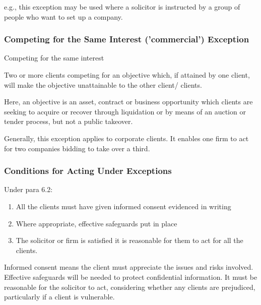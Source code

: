 \documentclass[
]{article}
\providecommand{\tightlist}{%
  \setlength{\itemsep}{0pt}\setlength{\parskip}{0pt}}
\newenvironment{env-86a00e9b-0e00-4fe8-86cd-090a54119c0f}
{
    \savenotes\tcolorbox[blanker,breakable,left=5pt,borderline west={2pt}{-4pt}{gold}]
}
{
    \endtcolorbox\spewnotes
}
\begin{document}
e.g., this exception may be used where a solicitor is instructed by a
group of people who want to set up a company.

\hypertarget{competing-for-the-same-interest-commercial-exception}{%
\subsubsection{Competing for the Same Interest ('commercial')
Exception}\label{competing-for-the-same-interest-commercial-exception}}

\begin{env-86a00e9b-0e00-4fe8-86cd-090a54119c0f}

Competing for the same interest

Two or more clients competing for an objective which, if attained by one
client, will make the objective unattainable to the other client/
clients.

\end{env-86a00e9b-0e00-4fe8-86cd-090a54119c0f}

Here, an objective is an asset, contract or business opportunity which
clients are seeking to acquire or recover through liquidation or by
means of an auction or tender process, but not a public takeover.

Generally, this exception applies to corporate clients. It enables one
firm to act for two companies bidding to take over a third.

\hypertarget{conditions-for-acting-under-exceptions}{%
\subsubsection{Conditions for Acting Under
Exceptions}\label{conditions-for-acting-under-exceptions}}

Under para 6.2:

\begin{enumerate}
\tightlist
\item
  All the clients must have given informed consent evidenced in writing
\item
  Where appropriate, effective safeguards put in place
\item
  The solicitor or firm is satisfied it is reasonable for them to act
  for all the clients.
\end{enumerate}

Informed consent means the client must appreciate the issues and risks
involved. Effective safeguards will be needed to protect confidential
information. It must be reasonable for the solicitor to act, considering
whether any clients are prejudiced, particularly if a client is
vulnerable.
\end{document}
